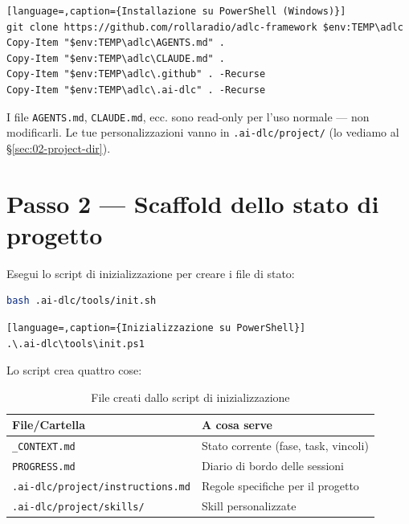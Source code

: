 \begin{lstlisting}[language=,caption={Installazione su PowerShell (Windows)}]
git clone https://github.com/rollaradio/adlc-framework $env:TEMP\adlc
Copy-Item "$env:TEMP\adlc\AGENTS.md" .
Copy-Item "$env:TEMP\adlc\CLAUDE.md" .
Copy-Item "$env:TEMP\adlc\.github" . -Recurse
Copy-Item "$env:TEMP\adlc\.ai-dlc" . -Recurse
\end{lstlisting}

\begin{notebox}
I file \texttt{AGENTS.md}, \texttt{CLAUDE.md}, ecc. sono read-only per l'uso normale --- non modificarli. Le tue personalizzazioni vanno in \texttt{.ai-dlc/project/} (lo vediamo al §\ref{sec:02-project-dir}).
\end{notebox}

\section{Passo 2 --- Scaffold dello stato di progetto}
\label{sec:02-passo2-scaffold}

Esegui lo script di inizializzazione per creare i file di stato:

\begin{lstlisting}[language=bash,caption={Inizializzazione su Bash}]
bash .ai-dlc/tools/init.sh
\end{lstlisting}

\begin{lstlisting}[language=,caption={Inizializzazione su PowerShell}]
.\.ai-dlc\tools\init.ps1
\end{lstlisting}

Lo script crea quattro cose:

\begin{table}[htbp]
  \centering
  \begin{tabular}{ll}
    \toprule
    \textbf{File/Cartella} & \textbf{A cosa serve} \\
    \midrule
    \texttt{\_CONTEXT.md} & Stato corrente (fase, task, vincoli) \\
    \texttt{PROGRESS.md} & Diario di bordo delle sessioni \\
    \texttt{.ai-dlc/project/instructions.md} & Regole specifiche per il progetto \\
    \texttt{.ai-dlc/project/skills/} & Skill personalizzate \\
    \bottomrule
  \end{tabular}
  \caption{File creati dallo script di inizializzazione}
  \label{tab:02-init-files}
\end{table}

